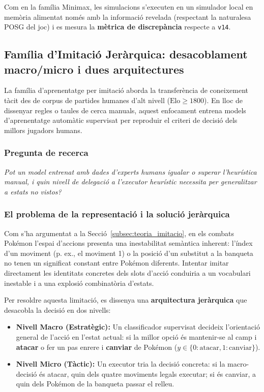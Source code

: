 Com en la família Minimax, les simulacions s'executen en un simulador local en memòria alimentat només amb la informació revelada (respectant la naturalesa POSG del joc) i es mesura la \textbf{mètrica de discrepància} respecte a \texttt{v14}.

\subsection{Família d'Imitació Jeràrquica: desacoblament macro/micro i dues arquitectures}

La família d'aprenentatge per imitació aborda la transferència de coneixement tàcit des de corpus de partides humanes d'alt nivell ($\text{Elo} \ge 1800$). En lloc de dissenyar regles o taules de cerca manuals, aquest enfocament entrena models d'aprenentatge automàtic supervisat per reproduir el criteri de decisió dels millors jugadors humans.

\subsubsection*{Pregunta de recerca}

\emph{Pot un model entrenat amb dades d'experts humans igualar o superar l'heurística manual, i quin nivell de delegació a l'executor heurístic necessita per generalitzar a estats no vistos?}

\subsubsection*{El problema de la representació i la solució jeràrquica}

Com s'ha argumentat a la Secció~\ref{subsec:teoria_imitacio}, en els combats Pokémon l'espai d'accions presenta una inestabilitat semàntica inherent: l'índex d'un moviment (p. ex., el moviment 1) o la posició d'un substitut a la banqueta no tenen un significat constant entre Pokémon diferents. Intentar imitar directament les identitats concretes dels slots d'acció conduiria a un vocabulari inestable i a una explosió combinatòria d'estats.

Per resoldre aquesta limitació, es dissenya una \textbf{arquitectura jeràrquica} que desacobla la decisió en dos nivells:
\begin{itemize}
    \item \textbf{Nivell Macro (Estratègic):} Un classificador supervisat decideix l'orientació general de l'acció en l'estat actual: si la millor opció és mantenir-se al camp i \textbf{atacar} o fer un pas enrere i \textbf{canviar} de Pokémon ($y \in \{0: \text{atacar}, 1: \text{canviar}\}$).
    \item \textbf{Nivell Micro (Tàctic):} Un executor tria la decisió concreta: si la macro-decisió és atacar, quin dels quatre moviments legals executar; si és canviar, a quin dels Pokémon de la banqueta passar el relleu.
\end{itemize}

